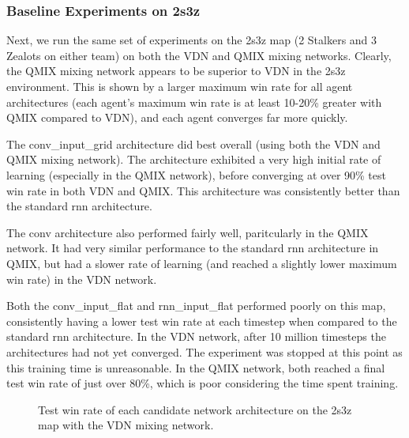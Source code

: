 \subsubsection{Baseline Experiments on 2s3z}
Next, we run the same set of  experiments on the 2s3z map (2 Stalkers and 3 Zealots on either team) on both the VDN and QMIX mixing networks. Clearly, the QMIX mixing network appears to be superior to VDN in the 2s3z environment. This is shown by a larger maximum win rate for all agent architectures (each agent's maximum win rate is at least 10-20\% greater with QMIX compared to VDN), and each agent converges far more quickly.

The conv\_input\_grid architecture did best overall (using both the VDN and QMIX mixing network). The architecture exhibited a very high initial rate of learning (especially in the QMIX network), before converging at over 90\% test win rate in both VDN and QMIX. This architecture was consistently better than the standard rnn architecture.

The conv architecture also performed fairly well, paritcularly in the QMIX network. It had very similar performance to the standard rnn architecture in QMIX, but had a slower rate of learning (and reached a slightly lower maximum win rate) in the VDN network.

Both the conv\_input\_flat and rnn\_input\_flat performed poorly on this map, consistently having a lower test win rate at each timestep when compared to the standard rnn architecture. In the VDN network, after 10 million timesteps the architectures had not yet converged. The experiment was stopped at this point as this training time is unreasonable. In the QMIX network, both reached a final test win rate of just over 80\%, which is poor considering the time spent training.

\begin{figure}[!tbp]
  \centering
  \hfill
  \caption{Test win rate of each candidate network architecture on the 2s3z map with the VDN mixing network.}
\end{figure}

